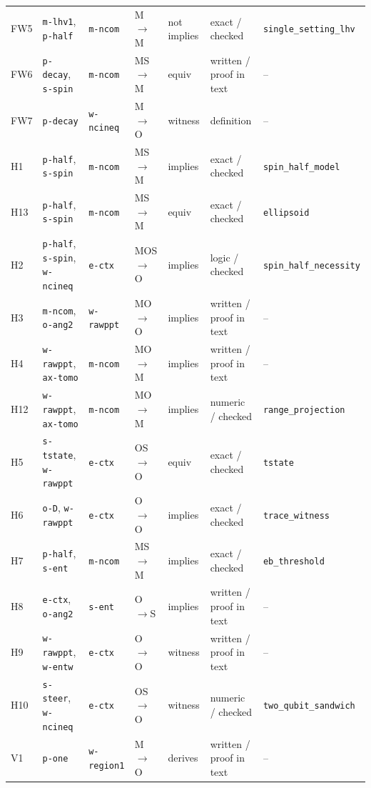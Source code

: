 \begin{ruledtabular}
\begin{tabular}{lllllll}
FW5 & \texttt{m-lhv1}, \texttt{p-half} & \texttt{m-ncom} & M$\to$M & not implies & exact / checked & \texttt{single\_setting\_lhv} \\
FW6 & \texttt{p-decay}, \texttt{s-spin} & \texttt{m-ncom} & MS$\to$M & equiv & written / proof in text & -- \\
FW7 & \texttt{p-decay} & \texttt{w-ncineq} & M$\to$O & witness & definition & -- \\
H1 & \texttt{p-half}, \texttt{s-spin} & \texttt{m-ncom} & MS$\to$M & implies & exact / checked & \texttt{spin\_half\_model} \\
H13 & \texttt{p-half}, \texttt{s-spin} & \texttt{m-ncom} & MS$\to$M & equiv & exact / checked & \texttt{ellipsoid} \\
H2 & \texttt{p-half}, \texttt{s-spin}, \texttt{w-ncineq} & \texttt{e-ctx} & MOS$\to$O & implies & logic / checked & \texttt{spin\_half\_necessity} \\
H3 & \texttt{m-ncom}, \texttt{o-ang2} & \texttt{w-rawppt} & MO$\to$O & implies & written / proof in text & -- \\
H4 & \texttt{w-rawppt}, \texttt{ax-tomo} & \texttt{m-ncom} & MO$\to$M & implies & written / proof in text & -- \\
H12 & \texttt{w-rawppt}, \texttt{ax-tomo} & \texttt{m-ncom} & MO$\to$M & implies & numeric / checked & \texttt{range\_projection} \\
H5 & \texttt{s-tstate}, \texttt{w-rawppt} & \texttt{e-ctx} & OS$\to$O & equiv & exact / checked & \texttt{tstate} \\
H6 & \texttt{o-D}, \texttt{w-rawppt} & \texttt{e-ctx} & O$\to$O & implies & exact / checked & \texttt{trace\_witness} \\
H7 & \texttt{p-half}, \texttt{s-ent} & \texttt{m-ncom} & MS$\to$M & implies & exact / checked & \texttt{eb\_threshold} \\
H8 & \texttt{e-ctx}, \texttt{o-ang2} & \texttt{s-ent} & O$\to$S & implies & written / proof in text & -- \\
H9 & \texttt{w-rawppt}, \texttt{w-entw} & \texttt{e-ctx} & O$\to$O & witness & written / proof in text & -- \\
H10 & \texttt{s-steer}, \texttt{w-ncineq} & \texttt{e-ctx} & OS$\to$O & witness & numeric / checked & \texttt{two\_qubit\_sandwich} \\
V1 & \texttt{p-one} & \texttt{w-region1} & M$\to$O & derives & written / proof in text & -- \\
\end{tabular}
\end{ruledtabular}

